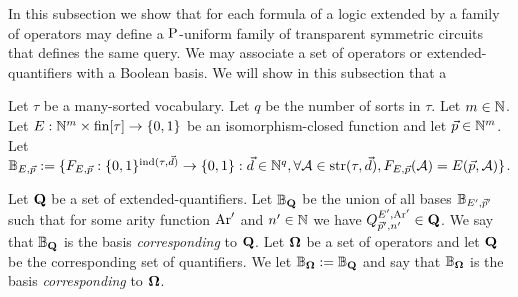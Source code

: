 \documentclass[../main/thesis.tex]{subfiles}
\begin{document}

In this subsection we show that for each formula of a logic extended by a family
of operators may define a $\mathrm{P}$-uniform family of transparent symmetric circuits
that defines the same query. We may associate a set of operators or
extended-quantifiers with a Boolean basis. We will show in this subsection that
a
\begin{definition}
  Let $\tau$ be a many-sorted vocabulary. Let $q$ be the number of sorts in
  $\tau$. Let $m \in \mathbb{N}$. Let $E : \mathbb{N}^m \times \text{\upshape fin}[\tau] \rightarrow \{0,1\}$ be
  an isomorphism-closed function and let $\vec{p} \in \mathbb{N}^m$. Let $\mathbb{B}_{E,
    \vec{p}} := \{F_{E, \vec{p}}: \{0,1\}^{\text{\upshape ind}(\tau, \vec{d})}\rightarrow \{0,1\} :
  \vec{d} \in \mathbb{N}^{q}, \forall \mathcal{A} \in \text{str}(\tau, \vec{d}), F_{E,
    \vec{p}}(\mathcal{A}) = E(\vec{p}, \mathcal{A})\}$.

  Let $\mathbf{Q}$ be a set of extended-quantifiers. Let $\mathbb{B}_{\mathbf{Q}}$ be the
  union of all bases $\mathbb{B}_{E', \vec{p}'}$ such that for some arity function
  $\text{\upshape Ar}'$ and $n' \in \mathbb{N}$ we have $Q^{E', \text{\upshape Ar}'}_{\vec{p}', n'} \in \mathbf{Q}$.
  We say that $\mathbb{B}_{\mathbf{Q}}$ is the basis \emph{corresponding} to
  $\mathbf{Q}$. Let $\mathbf{\mathbf{\Omega}}$ be a set of operators and let $\mathbf{Q}$ be the
  corresponding set of quantifiers. We let $\mathbb{B}_{\mathbf{\mathbf{\Omega}}} := \mathbb{B}_{\mathbf{Q}}$ and
  say that $\mathbb{B}_{\mathbf{\mathbf{\Omega}}}$ is the basis \emph{corresponding} to $\mathbf{\mathbf{\Omega}}$.
\end{definition}
\end{document}
